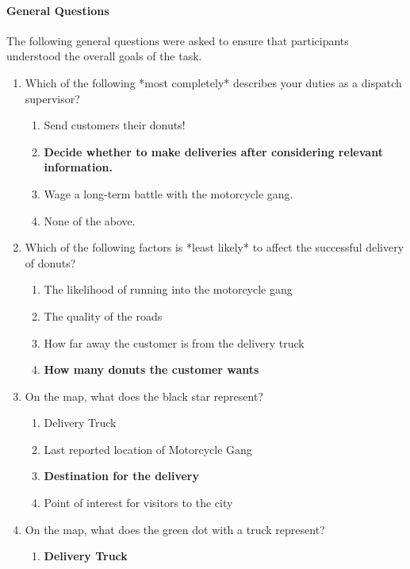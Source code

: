 \paragraph{General Questions} The following general questions were asked to ensure that participants understood the overall goals of the task. 
\begin{quoting}
\begin{enumerate}
    \item Which of the following *most completely* describes your duties as a dispatch supervisor?
    \begin{enumerate}[label=(\alph*)]
        \item Send customers their donuts!
        \item \textbf{Decide whether to make deliveries after considering relevant information.}
        \item Wage a long-term battle with the motorcycle gang.
        \item None of the above.
    \end{enumerate}
    \item Which of the following factors is *least likely* to affect the successful delivery of donuts?
    \begin{enumerate}[label=(\alph*)]
        \item The likelihood of running into the motorcycle gang
        \item The quality of the roads
        \item How far away the customer is from the delivery truck
        \item \textbf{How many donuts the customer wants}
    \end{enumerate}
    \item On the map, what does the black star represent?
    \begin{enumerate}[label=(\alph*)]
        \item Delivery Truck
        \item Last reported location of Motorcycle Gang
        \item \textbf{Destination for the delivery}
        \item Point of interest for visitors to the city
    \end{enumerate}
    \item On the map, what does the green dot with a truck represent?
    \begin{enumerate}[label=(\alph*)]
        \item \textbf{Delivery Truck}

\end{enumerate}
\end{enumerate}
\end{quoting}
